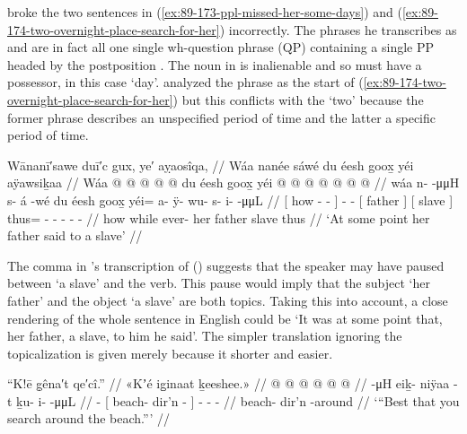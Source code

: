 \citeauthor{swanton:1909} broke the two sentences in (\ref{ex:89-173-ppl-missed-her-some-days}) and (\ref{ex:89-174-two-overnight-place-search-for-her}) incorrectly.
The phrases he transcribes as  and  are in fact all one single wh-question phrase (QP) containing a single PP headed by the postposition .
The noun  in  is inalienable and so must have a possessor, in this case  ‘day’.
\citeauthor{leer:1977} analyzed the phrase  as the start of (\ref{ex:89-174-two-overnight-place-search-for-her}) but this conflicts with the  ‘two’ because the former phrase describes an unspecified period of time and the latter a specific period of time.

\ex\label{ex:89-175-fathers-slave-says}%
%
\begingl
	\glpreamble	Wānanī′sawe duī′c gux, ye′ aỵaosîqa, //
	\glpreamble	Wáa nanée sáwé du éesh goox̱ yéi aÿawsiḵaa //
	\gla	{} Wáa  @ {} @ {} @ {} {}  @ {} @ {}
		{} du éesh {}
		{} goox̱ {}
		yéi @  @ {} @ {} @ {} @ {} @ {} @ {} //
	\glb	{} wáa n-  -μμH {} {} s- á -wé
		{} du éesh {}
		{} goox̱ {}
		yéi= a- ÿ- wu- s- i-  -μμL //
	\glc	{}[ how -  - \· {}] -  -
		{}[  father {}]
		{}[ slave {}]
		thus= - - - -  - //
	\gld	{} how  {} {} \·while {} ever-  {} 
		{} her father {}
		{} slave {}
		thus  {} {} {} {} {} {} //
	\glft	‘At some point her father said to a slave’
		//
\endgl
\xe

The comma in \citeauthor{swanton:1909}’s transcription of (\lastx) suggests that the speaker may have paused between  ‘a slave’ and the verb.
This pause would imply that the subject  ‘her father’ and the object  ‘a slave’ are both topics.
Taking this into account, a close rendering of the whole sentence in English could be ‘It was at some point that, her father, a slave, to him he said’.
The simpler translation ignoring the topicalization is given merely because it shorter and easier.

\ex\label{ex:89-176-search-around-the-beach}%
%
\begingl
	\glpreamble	“K!ē g̣êna′t qe′cî.” //
	\glpreamble	«\!Kʼé ig̱inaat ḵeeshee.\!» //
	\gla	{} @ {}
		{}  @ {} @ {} {}
		 @ {} @ {} @ {} //
	\glb	\pqp{} -μH
		{} eiḵ- niÿaa -t {}
		ḵu- i-  -μμL //
	\glc	\pqp{} -
		{}[ beach- dir’n - {}]
		- -  - //
	\gld	\pqp{} {}
		{} beach- dir’n -around {}
		 {} {} {} {} //
	\glft	‘“Best that you search around the beach.”’
		//
\endgl
\xe

